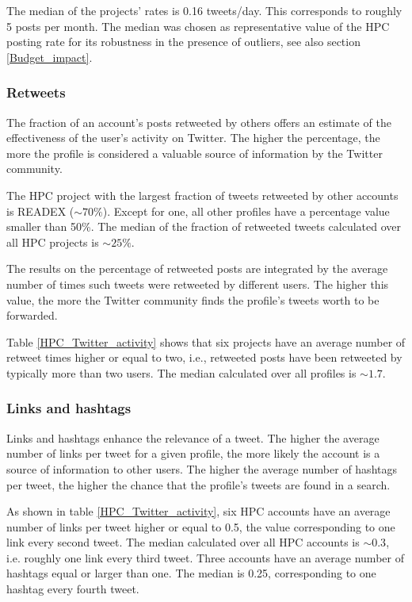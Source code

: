 The median of the projects' rates is 0.16 tweets/day. This corresponds to roughly 5 posts per month. The median was chosen as representative value of the HPC posting rate for its robustness in the presence of outliers, see also section \ref{Budget_impact}.

\subsubsection{Retweets}
The fraction of an account's posts retweeted by others offers an estimate of the effectiveness of the user's  activity on Twitter. The higher the percentage, the more the profile is considered a valuable source of information by the Twitter community. 

The HPC project with the largest fraction of tweets retweeted by other accounts is READEX ($\sim 70\%$). Except for one, all other profiles have a percentage value smaller than 50\%. The median of the fraction of retweeted tweets calculated over all HPC projects is $\sim 25\%$.

The results on the percentage of retweeted posts are integrated by the average number of times such tweets were retweeted by different users. The higher this value, the more the Twitter community finds the profile's tweets worth to be forwarded. 

Table \ref{HPC_Twitter_activity} shows that six projects have an average number of retweet times higher or equal to two, i.e., retweeted posts have been retweeted by typically more than two users. The median calculated over all profiles is $\sim 1.7$.

\subsubsection{Links and hashtags}
Links and hashtags enhance the relevance of a tweet. The higher the average number of links per tweet for a given profile, the more likely the account is a source of information to other users. The higher the average number of hashtags per tweet, the higher the chance that the profile's tweets are found in a search.

As shown in table \ref{HPC_Twitter_activity}, six HPC accounts have an average number of links per tweet higher or equal to 0.5, the value corresponding to one link every second tweet. The median calculated over all HPC accounts is $\sim 0.3$, i.e. roughly one link every third tweet. Three accounts have an average number of hashtags equal or larger than one. The median is 0.25, corresponding to one hashtag every fourth tweet.


